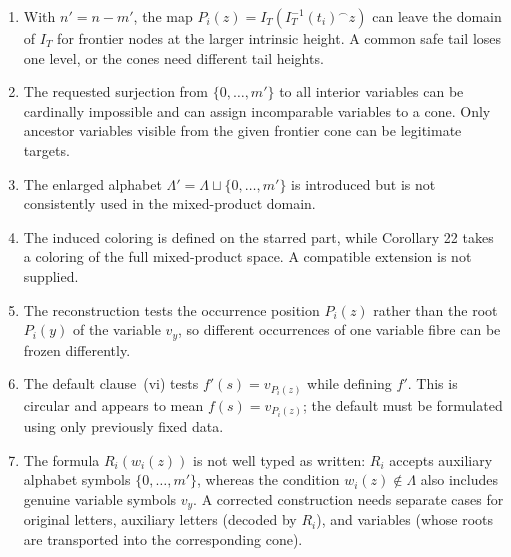 \documentclass[11pt]{article}
\begin{document}
\begin{enumerate}[label=(\alph*)]
\item With $n'=n-m'$, the map
$P_i(z)=I_T(I_T^{-1}(t_i)^\frown z)$ can leave the domain of $I_T$ for
frontier nodes at the larger intrinsic height.  A common safe tail loses one
level, or the cones need different tail heights.
\item The requested surjection from $\{0,\ldots,m'\}$ to all interior
variables can be cardinally impossible and can assign incomparable variables
to a cone.  Only ancestor variables visible from the given frontier cone can
be legitimate targets.
\item The enlarged alphabet
$\Lambda'=\Lambda\sqcup\{0,\ldots,m'\}$ is introduced but is not consistently
used in the mixed-product domain.
\item The induced coloring is defined on the starred part, while Corollary 22
takes a coloring of the full mixed-product space.  A compatible extension is
not supplied.
\item The reconstruction tests the occurrence position $P_i(z)$ rather than
the root $P_i(y)$ of the variable $v_y$, so different occurrences of one
variable fibre can be frozen differently.
\item The default clause~(vi) tests $f'(s)=v_{P_i(z)}$ while defining $f'$.
This is circular and appears to mean $f(s)=v_{P_i(z)}$; the default must be
formulated using only previously fixed data.
\item The formula $R_i(w_i(z))$ is not well typed as written: $R_i$ accepts
auxiliary alphabet symbols $\{0,\ldots,m'\}$, whereas the condition
$w_i(z)\notin\Lambda$ also includes genuine variable symbols $v_y$.
A corrected construction needs separate cases for original letters,
auxiliary letters (decoded by $R_i$), and variables (whose roots are
transported into the corresponding cone).
\end{enumerate}
\end{document}
